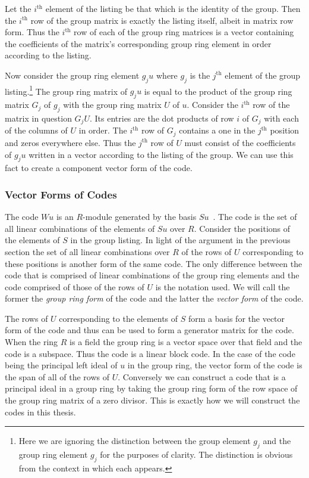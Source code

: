 Let the $i^{\textrm{th}}$ element of the listing be that which is the identity of the group.
Then the $i^{\textrm{th}}$ row of the group matrix is exactly the listing itself, albeit in matrix row form.
Thus the $i^{\textrm{th}}$ row of each of the group ring matrices is a vector containing the coefficients of the matrix's corresponding group ring element in order according to the listing.

Now consider the group ring element $g_j u$ where $g_j$ is the $j^{\textrm{th}}$ element of the group listing.\footnote{Here we are ignoring the distinction between the group element $g_j$ and the group ring element $g_j$ for the purposes of clarity. The distinction is obvious from the context in which each appears.}
The group ring matrix of $g_j u$ is equal to the product of the group ring matrix $G_j$ of $g_j$ with the group ring matrix $U$ of $u$.
Consider the $i^{\textrm{th}}$ row of the matrix in question $G_j U$.
Its entries are the dot products of row $i$ of $G_j$ with each of the columns of $U$ in order.
The $i^{\textrm{th}}$ row of $G_j$ contains a one in the $j^{\textrm{th}}$ position and zeros everywhere else.
Thus the $j^{\textrm{th}}$ row of $U$ must consist of the coefficients of $g_j u$ written in a vector according to the listing of the group.
We can use this fact to create a component vector form of the code.

\subsubsection{Vector Forms of Codes}
\label{sect:vectorforms}
The code $Wu$ is an $R$-module generated by the basis $Su$~\cite{hur07,hur09}.
The code is the set of all linear combinations of the elements of $Su$ over $R$.
Consider the positions of the elements of $S$ in the group listing.
In light of the argument in the previous section the set of all linear combinations over $R$ of the rows of $U$ corresponding to these positions is another form of the same code.
The only difference between the code that is comprised of linear combinations of the group ring elements and the code comprised of those of the rows of $U$ is the notation used.
We will call the former the \emph{group ring form} of the code and the latter the \emph{vector form} of the code.

The rows of $U$ corresponding to the elements of $S$ form a basis for the vector form of the code and thus can be used to form a generator matrix for the code.
When the ring $R$ is a field the group ring is a vector space over that field and the code is a subspace.
Thus the code is a linear block code.
In the case of the code being the principal left ideal of $u$ in the group ring, the vector form of the code is the span of all of the rows of $U$.
Conversely we can construct a code that is a principal ideal in a group ring by taking the group ring form of the row space of the group ring matrix of a zero divisor.
This is exactly how we will construct the codes in this thesis.


